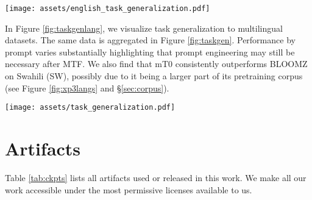 \documentclass[11pt]{article}
\begin{document}
\begin{figure*}[htbp]
\texttt{[image: assets/english\_task\_generalization.pdf]}
\centering
\caption{Zero-shot English task generalization. Each dot represents performance on one English evaluation prompt.}
\label{fig:taskgeneng}
\end{figure*}

\newpage

In Figure \ref{fig:taskgenlang}, we visualize task generalization to multilingual datasets. The same data is aggregated in Figure \ref{fig:taskgen}. Performance by prompt varies substantially highlighting that prompt engineering may still be necessary after MTF. We also find that mT0 consistently outperforms BLOOMZ on Swahili (SW), possibly due to it being a larger part of its pretraining corpus (see Figure \ref{fig:xp3langs} and \S\ref{sec:corpus}).

\begin{figure*}[htbp]
\texttt{[image: assets/task\_generalization.pdf]}
\centering
\caption{Zero-shot multilingual task generalization on languages seen during pretraining and finetuning. Each dot represents performance on one English evaluation prompt.}
\label{fig:taskgenlang}
\end{figure*}


\FloatBarrier
\newpage


\section{Artifacts}
\label{sec:artifacts}

Table \ref{tab:ckpts} lists all artifacts used or released in this work. We make all our work accessible under the most permissive licenses available to us.
\end{document}
